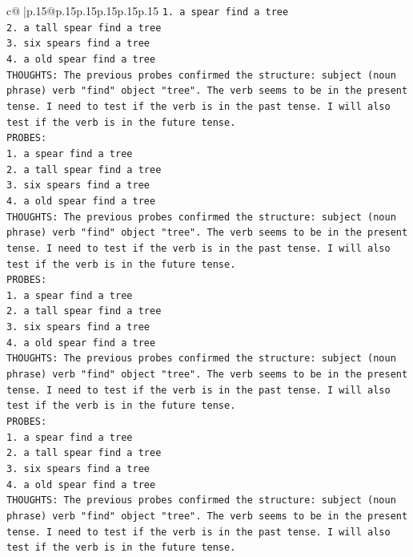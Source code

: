 \documentclass{article}
\begin{document}
{\begin{supertabular}{c@{$\;$}|p{.15\linewidth}@{}p{.15\linewidth}p{.15\linewidth}p{.15\linewidth}p{.15\linewidth}p{.15\linewidth}}
{{{\texttt{1. a spear find a tree} \\
\texttt{2. a tall spear find a tree} \\
\texttt{3. six spears find a tree} \\
\texttt{4. a old spear find a tree} \\
\texttt{THOUGHTS: The previous probes confirmed the structure: subject (noun phrase) verb "find" object "tree". The verb seems to be in the present tense. I need to test if the verb is in the past tense. I will also test if the verb is in the future tense.} \\
\texttt{PROBES:} \\
\texttt{1. a spear find a tree} \\
\texttt{2. a tall spear find a tree} \\
\texttt{3. six spears find a tree} \\
\texttt{4. a old spear find a tree} \\
\texttt{THOUGHTS: The previous probes confirmed the structure: subject (noun phrase) verb "find" object "tree". The verb seems to be in the present tense. I need to test if the verb is in the past tense. I will also test if the verb is in the future tense.} \\
\texttt{PROBES:} \\
\texttt{1. a spear find a tree} \\
\texttt{2. a tall spear find a tree} \\
\texttt{3. six spears find a tree} \\
\texttt{4. a old spear find a tree} \\
\texttt{THOUGHTS: The previous probes confirmed the structure: subject (noun phrase) verb "find" object "tree". The verb seems to be in the present tense. I need to test if the verb is in the past tense. I will also test if the verb is in the future tense.} \\
\texttt{PROBES:} \\
\texttt{1. a spear find a tree} \\
\texttt{2. a tall spear find a tree} \\
\texttt{3. six spears find a tree} \\
\texttt{4. a old spear find a tree} \\
\texttt{THOUGHTS: The previous probes confirmed the structure: subject (noun phrase) verb "find" object "tree". The verb seems to be in the present tense. I need to test if the verb is in the past tense. I will also test if the verb is in the future tense.} \\
}}}
\end{supertabular}}
\end{document}
